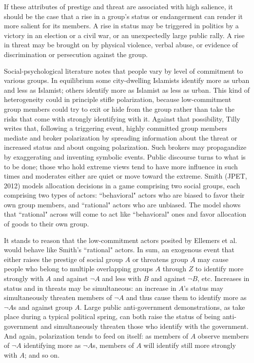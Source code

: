 \documentclass[12pt]{article}
\begin{document}
If these attributes of prestige and threat are associated with high salience, it should be the case that a rise in a group's status or endangerment can render it more salient for its members.  A rise in status may be triggered in politics by a victory in an election or a civil war, or an unexpectedly large public rally.  A rise in threat may be brought on by physical violence, verbal abuse, or evidence of discrimination or persecution against the group.

Social-psychological literature notes that people vary by level of commitment to various groups.   In equilibrium some city-dwelling Islamists identify more as urban and less as Islamist; others identify more as Islamist as less as urban.  This kind of heterogeneity could in principle stifle polarization, because low-commitment group members could try to exit or hide from the group rather than take the risks that come with strongly identifying with it.  Against that possibility, Tilly writes that, following a triggering event, highly committed group members mediate and broker polarization by spreading information about the threat or increased status and about ongoing polarization.   Such brokers may propagandize by exaggerating and inventing symbolic events.  Public discourse turns to what is to be done; those who hold extreme views tend to have more influence in such times and moderates either are quiet or move toward the extreme.   Smith (JPET, 2012) models allocation decisions in a game comprising two social groups, each comprising two types of actors:  ``behavioral" actors who are biased to favor their own group members, and ``rational" actors who are unbiased.  The model shows that ``rational" across will come to act like ``behavioral" ones and favor allocation of goods to their own group.  

It stands to reason that the low-commitment actors posited by Ellemers et al. would behave like Smith's ``rational" actors.
In sum, an exogenous event that either raises the prestige of social group $A$ or threatens group $A$ may cause people who belong to multiple overlapping groups $A$ through $Z$ to identify more strongly with $A$ and against $\neg A$ and less with $B$ and against $\neg B$, etc.  Increases in status and in threats may be simultaneous:  an increase in $A$'s status may simultaneously threaten members of $\neg A$ and thus cause them to identify more as $\neg A$s and against group $A$.  Large public anti-government demonstrations, as take place during a typical political spring, can both raise the status of being anti-government and simultaneously threaten those who identify with the government.  And again, polarization tends to feed on itself:  as members of $A$ observe members of $\neg A$ identifying more as $\neg A$s, members of $A$ will identify still more strongly with $A$; and so on. 
 
\end{document}
